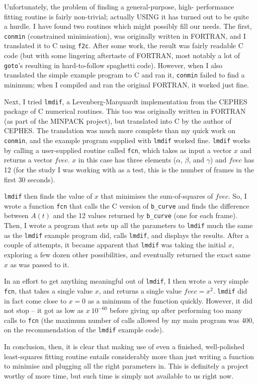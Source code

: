 Unfortunately, the problem of finding a general-purpose, high-
performance fitting routine is fairly non-trivial; actually USING it
has turned out to be quite a hurdle.  I have found two routines which
might possibly fill our needs.  The first, \verb|conmin| (constrained
minimisation), was originally written in FORTRAN, and I translated it
to C using \verb|f2c|.  After some work, the result was fairly
readable C code (but with some lingering aftertaste of FORTRAN, most
notably a lot of \verb|goto|'s resulting in hard-to-follow spaghetti
code).  However, when I also translated the simple example program to
C and ran it, \verb|conmin| failed to find a minimum; when I compiled
and ran the original FORTRAN, it worked just fine.

Next, I tried \verb|lmdif|, a Levenberg-Marquardt implementation from
the CEPHES package of C numerical routines.  This too was originally
written in FORTRAN (as part of the MINPACK project), but translated
into C by the author of CEPHES.  The translation was much more
complete than my quick work on \verb|conmin|, and the example program
supplied with \verb|lmdif| worked fine.  \verb|lmdif| works by calling
a user-supplied routine called \verb|fcn|, which takes as input a
vector $x$ and returns a vector $fvec$.  $x$ in this case has three
elements ($\alpha$, $\beta$, and $\gamma$) and $fvec$ has 12 (for the
study I was working with as a test, this is the number of frames in
the first 30 seconds).

\verb|lmdif| then finds the value of $x$ that minimises the sum-of-squares of
$fvec$.  So, I wrote a function \verb|fcn| that calls the C version of
\verb|b_curve| and finds the difference between $A(t)$ and the 12 values
returned by \verb|b_curve| (one for each frame).  Then, I wrote a
program that sets up all the parameters to \verb|lmdif| much the same
as the \verb|lmdif| example program did, calls \verb|lmdif|, and
displays the results.  After a couple of attempts, it became apparent
that \verb|lmdif| was taking the initial $x$, exploring a few dozen
other possibilities, and eventually returned the exact same $x$ as was
passed to it.

In an effort to get anything meaningful out of \verb|lmdif|, I then
wrote a very simple \verb|fcn|, that takes a single value $x$, and
returns a single value $fvec = x^{2}$.  \verb|lmdif| did in fact come
close to $x=0$ as a minimum of the function quickly.  However, it did
not stop -- it got as low as $x ~ 10^{-60}$ before giving up after
performing too many calls to \verb|fcn| (the maximum number of calls
allowed by my main program was 400, on the recommendation of the
\verb|lmdif| example code).

In conclusion, then, it is clear that making use of even a finished,
well-polished least-squares fitting routine entails considerably more
than just writing a function to minimise and plugging all the right
parameters in.  This is definitely a project worthy of more time, but
such time is simply not available to us right now.


